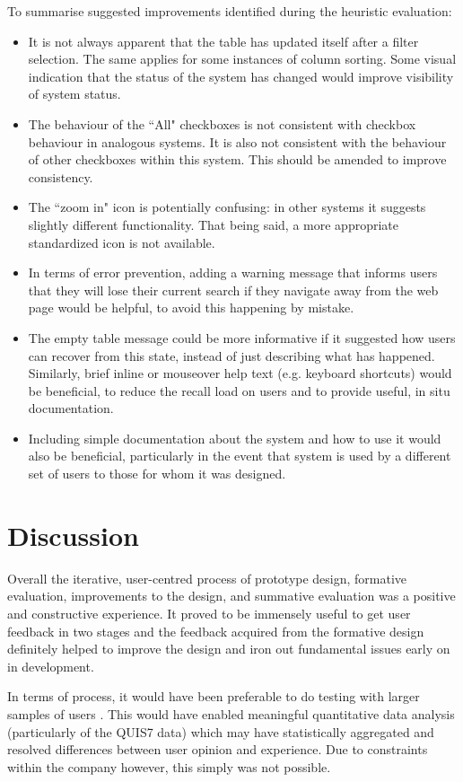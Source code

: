 To summarise suggested improvements identified during the heuristic evaluation:
\begin{itemize}
 \item It is not always apparent that the table has updated itself after a filter selection. The same applies for some instances of column sorting. Some visual indication that the status of the system has changed would improve visibility of system status. 
 \item The behaviour of the ``All" checkboxes is not consistent with checkbox behaviour in analogous systems. It is also not consistent with the behaviour of other checkboxes within this system. This should be amended to improve consistency.  
 \item The ``zoom in" icon is potentially confusing: in other systems it suggests slightly different functionality. That being said, a more appropriate standardized icon is not available. 
 \item In terms of error prevention, adding a warning message that informs users that they will lose their current search if they navigate away from the web page would be helpful, to avoid this happening by mistake. 
 \item The empty table message could be more informative if it suggested how users can recover from this state, instead of just describing what has happened. Similarly, brief inline or mouseover help text (e.g. keyboard shortcuts) would be beneficial, to reduce the recall load on users and to provide useful, in situ documentation. 
 \item Including simple documentation about the system and how to use it would also be beneficial, particularly in the event that system is used by a different set of users to those for whom it was designed. 
\end{itemize}
\section{Discussion}
Overall the iterative, user-centred process of prototype design, formative evaluation, improvements to the design, and summative evaluation was a positive and constructive experience. It proved to be immensely useful to get user feedback in two stages and the feedback acquired from the formative design definitely helped to improve the design and iron out fundamental issues early on in development.

In terms of process, it would have been preferable to do testing with larger samples of users \citep{Faulkner}. This would have enabled meaningful quantitative data analysis (particularly of the QUIS7 data) which may have statistically aggregated and resolved differences between user opinion and experience. Due to constraints within the company however, this simply was not possible. 

